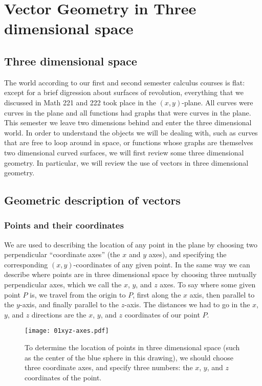 
\chapter{Vector Geometry in Three dimensional space}

\section{Three dimensional space}  
The world according to our first and second semester calculus courses is flat:
except for a brief digression about surfaces of revolution, everything that we
discussed in Math 221 and 222 took place in the $(x,y)$-plane.  All curves were
curves in the plane and all functions had graphs that were curves in the plane.
This semester we leave two dimensions behind and enter the three dimensional
world.  In order to understand the objects we will be dealing with, such as
curves that are free to loop around in space, or functions whose graphs are
themselves two dimensional curved surfaces, we will first review some three
dimensional geometry.  In particular, we will review the use of vectors in three
dimensional geometry.

\section{Geometric description of vectors}  
\label{sec:geometric-description-of-vectors}
\subsection{Points and their coordinates}  
We are used to describing the location of any point in the plane by choosing two
perpendicular ``coordinate axes'' (the $x$ and $y$ axes), and specifying the
corresponding $(x,y)$-coordinates of any given point.  In the same way we can
describe where points are in three dimensional space by choosing three mutually
perpendicular axes, which we call the $x$, $y$, and $z$ axes.  To say where some
given point $P$ is, we travel from the origin to $P$, first along the $x$ axis,
then parallel to the $y$-axis, and finally parallel to the $z$-axis.  The
distances we had to go in the $x$, $y$, and $z$ directions are the $x$, $y$, and
$z$ coordinates of our point $P$.

\begin{figure}[h]
  \centering
  \texttt{[image: 01xyz-axes.pdf]}
  \caption{To determine the location of points in three dimensional
    space (such as the center of the blue sphere in this drawing), we
    should choose three coordinate axes, and specify three numbers:
    the $x$, $y$, and $z$ coordinates of the point.  }
\end{figure}

